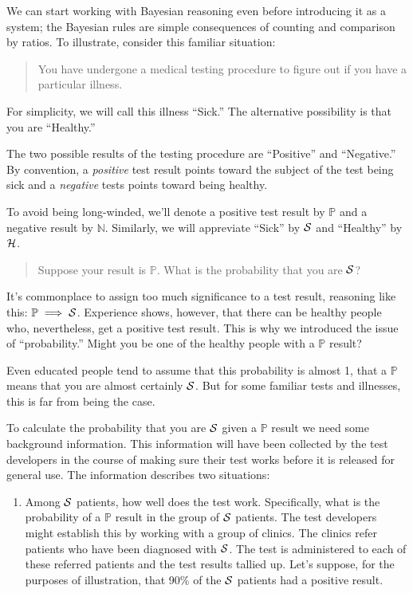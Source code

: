 \documentclass[
  letterpaper,
  DIV=11,
  numbers=noendperiod,
  oneside]{scrartcl}
\providecommand{\tightlist}{%
  \setlength{\itemsep}{0pt}\setlength{\parskip}{0pt}}\usepackage{longtable,booktabs,array}
\begin{document}
We can start working with Bayesian reasoning even before introducing it
as a system; the Bayesian rules are simple consequences of counting and
comparison by ratios. To illustrate, consider this familiar situation:

\begin{quote}
You have undergone a medical testing procedure to figure out if you have
a particular illness.
\end{quote}

For simplicity, we will call this illness ``Sick.'' The alternative
possibility is that you are ``Healthy.''

The two possible results of the testing procedure are ``Positive'' and
``Negative.'' By convention, a \emph{positive} test result points toward
the subject of the test being sick and a \emph{negative} tests points
toward being healthy.

To avoid being long-winded, we'll denote a positive test result by
\({\mathbb{P}}\) and a negative result by \({\mathbb{N}}\). Similarly,
we will appreviate ``Sick'' by \({\cal S}\) and ``Healthy'' by
\({\cal H}\).

\begin{quote}
Suppose your result is \({\mathbb{P}}\). What is the probability that
you are \({\cal S}\)?
\end{quote}

It's commonplace to assign too much significance to a test result,
reasoning like this: \({\mathbb{P}}\implies {\cal S}\). Experience
shows, however, that there can be healthy people who, nevertheless, get
a positive test result. This is why we introduced the issue of
``probability.'' Might you be one of the healthy people with a
\({\mathbb{P}}\) result?

Even educated people tend to assume that this probability is almost 1,
that a \({\mathbb{P}}\) means that you are almost certainly
\({\cal S}\). But for some familiar tests and illnesses, this is far
from being the case.

To calculate the probability that you are \({\cal S}\) given a
\({\mathbb{P}}\) result we need some background information. This
information will have been collected by the test developers in the
course of making sure their test works before it is released for general
use. The information describes two situations:

\begin{enumerate}
\def\labelenumi{\arabic{enumi}.}
\tightlist
\item
  Among \({\cal S}\) patients, how well does the test work.
  Specifically, what is the probability of a \({\mathbb{P}}\) result in
  the group of \({\cal S}\) patients. The test developers might
  establish this by working with a group of clinics. The clinics refer
  patients who have been diagnosed with \({\cal S}\). The test is
  administered to each of these referred patients and the test results
  tallied up. Let's suppose, for the purposes of illustration, that 90\%
  of the \({\cal S}\) patients had a positive result.
\end{enumerate}
\end{document}
